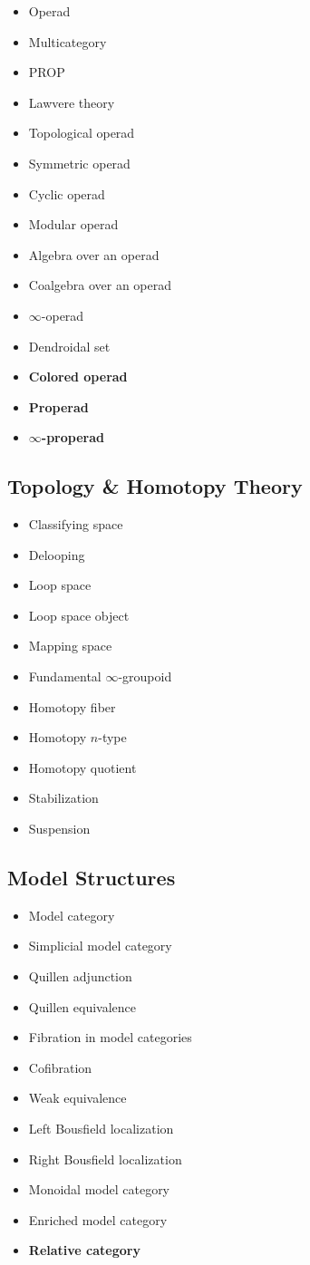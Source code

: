 \begin{itemize}
\item Operad
\item Multicategory
\item PROP
\item Lawvere theory
\item Topological operad
\item Symmetric operad
\item Cyclic operad
\item Modular operad
\item Algebra over an operad
\item Coalgebra over an operad
\item $\infty$-operad
\item Dendroidal set
\item \textbf{Colored operad}
\item \textbf{Properad}
\item \textbf{$\infty$-properad}
\end{itemize}

\subsection{Topology \& Homotopy Theory}

\begin{itemize}
\item Classifying space
\item Delooping
\item Loop space
\item Loop space object
\item Mapping space
\item Fundamental $\infty$-groupoid
\item Homotopy fiber
\item Homotopy $n$-type
\item Homotopy quotient
\item Stabilization
\item Suspension
\end{itemize}

\subsection{Model Structures}

\begin{itemize}
\item Model category
\item Simplicial model category
\item Quillen adjunction
\item Quillen equivalence
\item Fibration in model categories
\item Cofibration
\item Weak equivalence
\item Left Bousfield localization
\item Right Bousfield localization
\item Monoidal model category
\item Enriched model category
\item \textbf{Relative category}
\end{itemize}

